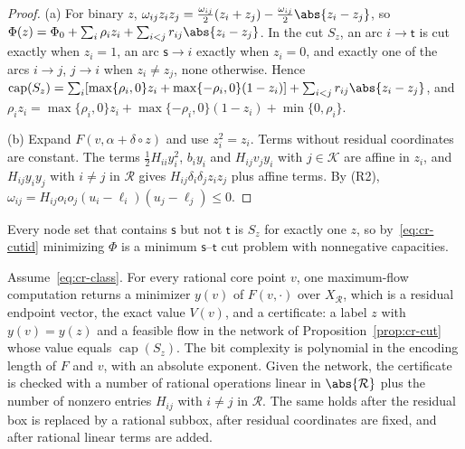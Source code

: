 \begin{proof}
(a) For binary $z$,
$\omega_{ij}z_iz_j=\frac{\omega_{ij}}2(z_i+z_j)-\frac{\omega_{ij}}2\abs{z_i-z_j}$,
so $\Phi(z)=\Phi_0+\sum_i\rho_iz_i+\sum_{i<j}r_{ij}\abs{z_i-z_j}$. In the
cut $S_z$, an arc $i\to\mathsf t$ is cut exactly when $z_i=1$, an arc
$\mathsf s\to i$ exactly when $z_i=0$, and exactly one of the arcs
$i\to j$, $j\to i$ when $z_i\ne z_j$, none otherwise. Hence
$\operatorname{cap}(S_z)=\sum_i[\max\{\rho_i,0\}z_i+\max\{-\rho_i,0\}(1-z_i)]
+\sum_{i<j}r_{ij}\abs{z_i-z_j}$, and
$\rho_iz_i=\max\{\rho_i,0\}z_i+\max\{-\rho_i,0\}(1-z_i)+\min\{0,\rho_i\}$.

(b) Expand $F(v,\alpha+\delta\circ z)$ and use $z_i^2=z_i$. Terms without
residual coordinates are constant. The terms $\frac12H_{ii}y_i^2$, $b_iy_i$
and $H_{ij}v_jy_i$ with $j\in\mathcal K$ are affine in $z_i$, and
$H_{ij}y_iy_j$ with $i\ne j$ in $\mathcal R$ gives
$H_{ij}\delta_i\delta_jz_iz_j$ plus affine terms. By (R2),
$\omega_{ij}=H_{ij}o_io_j(u_i-\ell_i)(u_j-\ell_j)\le0$.
\end{proof}

Every node set that contains $\mathsf s$ but not $\mathsf t$ is $S_z$ for
exactly one $z$, so by~\eqref{eq:cr-cutid} minimizing $\Phi$ is a minimum
$\mathsf s$--$\mathsf t$ cut problem with nonnegative capacities.

\begin{theorem}\label{thm:cr-oracle}
Assume~\eqref{eq:cr-class}. For every rational core point $v$, one
maximum-flow computation returns a minimizer $y(v)$ of $F(v,\cdot)$ over
$X_{\mathcal R}$, which is a residual endpoint vector, the exact value
$V(v)$, and a certificate: a label $z$ with $y(v)=y(z)$ and a feasible flow
in the network of Proposition~\ref{prop:cr-cut} whose value equals
$\operatorname{cap}(S_z)$. The bit complexity is polynomial in the encoding
length of $F$ and $v$, with an absolute exponent. Given the network, the
certificate is checked with a number of rational operations linear in
$\abs{\mathcal R}$ plus the number of nonzero entries $H_{ij}$ with
$i\ne j$ in $\mathcal R$. The same holds after the residual box is replaced
by a rational subbox, after residual coordinates are fixed, and after
rational linear terms are added.
\end{theorem}

